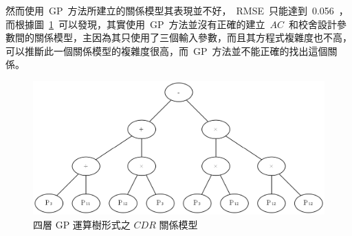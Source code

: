 
然而使用~GP~方法所建立的關係模型其表現並不好，~RMSE~只能達到~0.056~，而根據圖~\ref{fig:4LGP}~可以發現，其實使用~GP~方法並沒有正確的建立~$AC$~和校舍設計參數間的關係模型，主因為其只使用了三個輸入參數，而且其方程式複雜度也不高，可以推斷此一個關係模型的複雜度很高，而~GP~方法並不能正確的找出這個關係。

\begin{figure}[hbtp]
  \begin{center}
    \includegraphics[width=1.0\textwidth]{figures/4-layer-gp.png}
    \caption{四層 GP 運算樹形式之 $CDR$ 關係模型} 
    \label{fig:4LGP}
  \end{center}
\end{figure}


